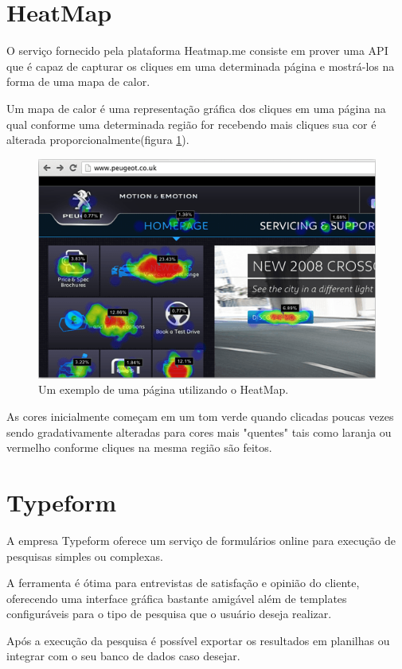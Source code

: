 \section{HeatMap}
\par O serviço fornecido pela plataforma Heatmap.me consiste em prover uma API que é capaz de capturar os cliques em uma determinada página e mostrá-los na forma de uma mapa de calor.
\par Um mapa de calor é uma representação gráfica dos cliques em uma página na qual conforme uma determinada região for recebendo mais cliques sua cor é alterada proporcionalmente(figura \ref{fig:heatmap_explanation}).
\begin{figure}[htb]
\centering
\includegraphics[width=15cm]{figuras/heatmap_explanation}
\caption{\label{fig:heatmap_explanation} Um exemplo de uma página utilizando o HeatMap.}
\end{figure}
\par As cores inicialmente começam em um tom verde quando clicadas poucas vezes sendo gradativamente alteradas para cores mais "quentes" tais como laranja ou vermelho conforme cliques na mesma região são feitos.

\section{Typeform}
\par A empresa Typeform oferece um serviço de formulários online para execução de pesquisas simples ou complexas.
\par A ferramenta é ótima para entrevistas de satisfação e opinião do cliente, oferecendo uma interface gráfica bastante amigável além de templates configuráveis para o tipo de pesquisa que o usuário deseja realizar.
\par Após a execução da pesquisa é possível exportar os resultados em planilhas ou integrar com o seu banco de dados caso desejar.
